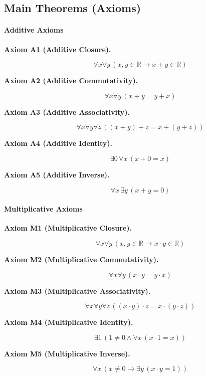 \subsection*{Main Theorems (Axioms)}


\paragraph{Additive Axioms}

\begin{description}

\item[\textbf{Axiom A1 (Additive Closure).}]
\[
\forall x \forall y \, (x,y \in \mathbb{R} \rightarrow x+y \in \mathbb{R})
\]

\item[\textbf{Axiom A2 (Additive Commutativity).}]
\[
\forall x \forall y \, (x+y = y+x)
\]

\item[\textbf{Axiom A3 (Additive Associativity).}]
\[
\forall x \forall y \forall z \, ((x+y)+z = x+(y+z))
\]

\item[\textbf{Axiom A4 (Additive Identity).}]
\[
\exists 0 \, \forall x \, (x+0 = x)
\]

\item[\textbf{Axiom A5 (Additive Inverse).}]
\[
\forall x \, \exists y \, (x+y = 0)
\]

\end{description}

\paragraph{Multiplicative Axioms}

\begin{description}

\item[\textbf{Axiom M1 (Multiplicative Closure).}]
\[
\forall x \forall y \, (x,y \in \mathbb{R} \rightarrow x\cdot y \in \mathbb{R})
\]

\item[\textbf{Axiom M2 (Multiplicative Commutativity).}]
\[
\forall x \forall y \, (x\cdot y = y\cdot x)
\]

\item[\textbf{Axiom M3 (Multiplicative Associativity).}]
\[
\forall x \forall y \forall z \, ((x\cdot y)\cdot z = x\cdot (y\cdot z))
\]

\item[\textbf{Axiom M4 (Multiplicative Identity).}]
\[
\exists 1 \, (1 \neq 0 \wedge \forall x \, (x\cdot 1 = x))
\]

\item[\textbf{Axiom M5 (Multiplicative Inverse).}]
\[
\forall x \, (x \neq 0 \rightarrow \exists y \, (x\cdot y = 1))
\]

\end{description}

